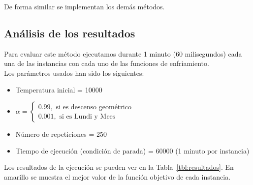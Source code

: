 \documentclass[12pt,a4paper,twoside,openright,titlepage,final]{article}
\begin{document}
De forma similar se implementan los demás métodos.

\subsection{Análisis de los resultados}

Para evaluar este método ejecutamos durante 1 minuto (60 milisegundos) cada una de las instancias con cada uno de las funciones de enfriamiento.\\

Los parámetros usados han sido los siguientes:

\begin{itemize}
	\item Temperatura inicial = 10000
	\item $\alpha = \begin{cases}
	0.99, \text{ si es descenso geométrico}\\
	0.001, \text{ si es Lundi y Mees}
	\end{cases}$
	\item Número de repeticiones = 250
	\item Tiempo de ejecución (condición de parada) = 60000 (1 minuto por instancia)
\end{itemize}

Los resultados de la ejecución se pueden ver en la Tabla~\ref{tbl:resultados}. En amarillo se muestra el mejor valor de la función objetivo de cada instancia.\\
\end{document}

